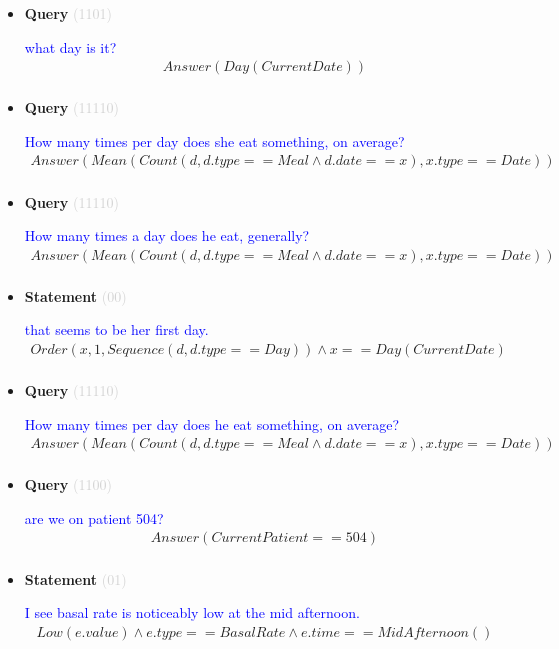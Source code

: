 \documentclass[11pt]{article}
\newcommand{\key}[1]{\textcolor{lightgray}{#1}}
\newcounter{CQuery}
\newcounter{CStatement}
\begin{document}
\begin{itemize}
\item
\textbf{Query\theCQuery} \key{(1101)} \addtocounter{CQuery}{1}
\textcolor{blue}{ what day is it? }
\begin{multline*}
Answer(Day(CurrentDate)) \\ 
\end{multline*}


\item
\textbf{Query\theCQuery} \key{(11110)} \addtocounter{CQuery}{1}
\textcolor{blue}{ How many times per day does she eat something, on average? }
\begin{multline*}
Answer(Mean(Count(d, d.type==Meal \wedge d.date==x), x.type==Date)) \\ 
\end{multline*}


\item
\textbf{Query\theCQuery} \key{(11110)} \addtocounter{CQuery}{1}
\textcolor{blue}{ How many times a day does he eat, generally? }
\begin{multline*}
Answer(Mean(Count(d, d.type==Meal \wedge d.date==x), x.type==Date)) \\ 
\end{multline*}


\item
\textbf{Statement\theCStatement} \key{(00)} \addtocounter{CStatement}{1}
\textcolor{blue}{ that seems to be her first day. }
\begin{multline*}
Order(x, 1, Sequence(d, d.type==Day)) \wedge x==Day(CurrentDate) \\ 
\end{multline*}


\item
\textbf{Query\theCQuery} \key{(11110)} \addtocounter{CQuery}{1}
\textcolor{blue}{ How many times per day does he eat something, on average? }
\begin{multline*}
Answer(Mean(Count(d, d.type==Meal \wedge d.date==x), x.type==Date)) \\ 
\end{multline*}


\item
\textbf{Query\theCQuery} \key{(1100)} \addtocounter{CQuery}{1}
\textcolor{blue}{ are we on patient 504? }
\begin{multline*}
Answer(CurrentPatient==504) \\ 
\end{multline*}


\item
\textbf{Statement\theCStatement} \key{(01)} \addtocounter{CStatement}{1}
\textcolor{blue}{ I see basal rate is noticeably low at the mid afternoon. }
\begin{multline*}
Low(e.value) \wedge e.type==BasalRate \wedge e.time==MidAfternoon() \\ 
\end{multline*}



\end{itemize}
\end{document}
